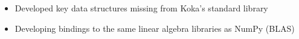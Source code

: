 \begin{itemize}
  \item Developed key data structures missing from Koka's standard library
  \item Developing bindings to the same linear algebra libraries as NumPy (BLAS)
\end{itemize}
\vspace{4pt}
